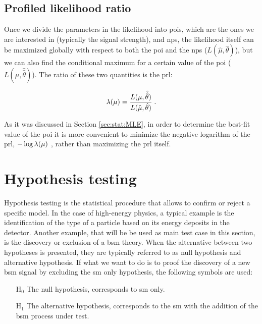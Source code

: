 \subsection{Profiled likelihood ratio}

Once we divide the parameters in the likelihood into \glspl{poi}, 
which are the ones we are interested in (typically the signal strength), 
and \glspl{np}, the likelihood itself can be maximized globally with respect to both the \gls{poi} and the \glspl{np} ($L(\hat{\mu}, \hat{\theta})$), but we can also find the conditional maximum for a certain value of the \gls{poi} ($L(\mu, \hat{\hat{\theta}})$). The ratio of these two quantities is the \gls{prl}:

\begin{equation}
\label{eq:stat:prl}
\lambda(\mu) = \frac{ L(\mu, \hat{\hat{\theta}}) } {L(\hat{\mu}, \hat{\theta}) } \;.
\end{equation}

\noindent As it was discussed in Section \ref{sec:stat:MLE},
in order to determine the best-fit value of the \gls{poi} it is more convenient to minimize the negative logarithm of the \gls{prl}, $- \log{\lambda(\mu)} \ $, 
rather than maximizing the \gls{prl} itself.


\section{Hypothesis testing}
\label{sec:stat:ht}

Hypothesis testing is the statistical procedure that allows to confirm or reject a specific model. In the case of high-energy physics, a typical example is the identification of the type of a particle based on its energy deposits in the detector. Another example, that will be be used as main test case in this section, is the discovery or exclusion of a \gls{bsm} theory. When the alternative between two hypotheses is presented, they are typically referred to as null hypothesis and alternative hypothesis. If what we want to do is to proof the discovery of a new \gls{bsm} signal by excluding the \gls{sm} only hypothesis, the following symbols are used:

\begin{itemize}
\item[H$_0$] The null hypothesis, corresponds to \gls{sm} only.
\item[H$_1$] The alternative hypothesis, corresponds to the \gls{sm} with the addition of the \gls{bsm} process under test.
\end{itemize}

